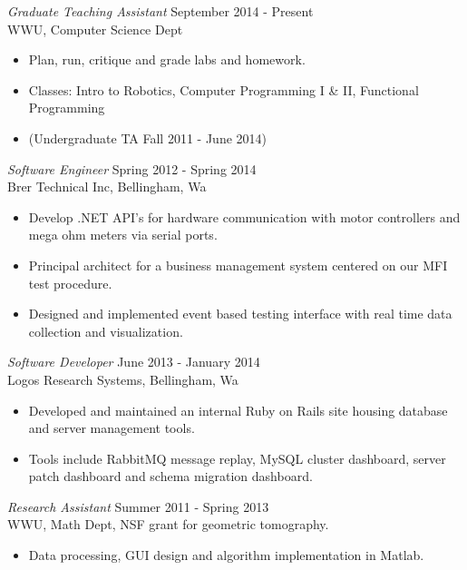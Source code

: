 \documentclass[line,margin]{res}
\begin{document}
\begin{resume}
                	{\sl Graduate Teaching Assistant} \hfill        September 2014 - Present \\
                	WWU, Computer Science Dept
                  	\begin{itemize} \itemsep -2pt
                   		\item Plan, run, critique and grade labs and homework.
			\item Classes: Intro to Robotics, Computer Programming I \& II, Functional Programming
			\item (Undergraduate TA Fall 2011 - June 2014)
                   	\end{itemize}

		{\sl Software Engineer} \hfill Spring 2012 - Spring 2014 \\
                	Brer Technical Inc, Bellingham, Wa
                	\begin{itemize}  \itemsep -2pt
                		\item Develop .NET API's for hardware communication with motor controllers and mega ohm meters via serial ports.
                		\item Principal architect for a business management system centered on our MFI test procedure.
			\item Designed and implemented event based testing interface with real time data collection and visualization.  
               	 \end{itemize}
 
		{\sl Software Developer} \hfill June 2013 - January 2014 \\
                	Logos Research Systems, Bellingham, Wa
               	 \begin{itemize}  \itemsep -2pt
                		\item Developed and maintained an internal Ruby on Rails site housing database and server management tools. 
	     		\item Tools include RabbitMQ message replay, MySQL cluster dashboard, server patch dashboard and schema migration dashboard.
                	\end{itemize}

                	{\sl Research Assistant} \hfill            Summer 2011 - Spring 2013 \\
                	WWU, Math Dept, NSF grant for geometric tomography.
                 	\begin{itemize}  \itemsep -2pt
                 		\item Data processing, GUI design and algorithm implementation in Matlab.
                 	\end{itemize} 


\end{resume}
\end{document}
